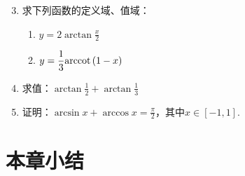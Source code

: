 \begin{enumerate}\setcounter{enumi}{2}
    \item 求下列函数的定义域、值域：
\begin{multicols}{2}
\begin{enumerate}[(1)]
    \item $y=2\arctan \frac{x}{2}$
    \item $y=\dfrac{1}{3}{\rm arccot\,} (1-x)$
\end{enumerate}
\end{multicols}

\item 求值：$\arctan\frac{1}{2}+\arctan\frac{1}{3}$
\item 证明：$\arcsin x+\arccos x=\frac{\pi}{2}$，其中$x\in[-1,1]$.

\end{enumerate}


\section{本章小结}

